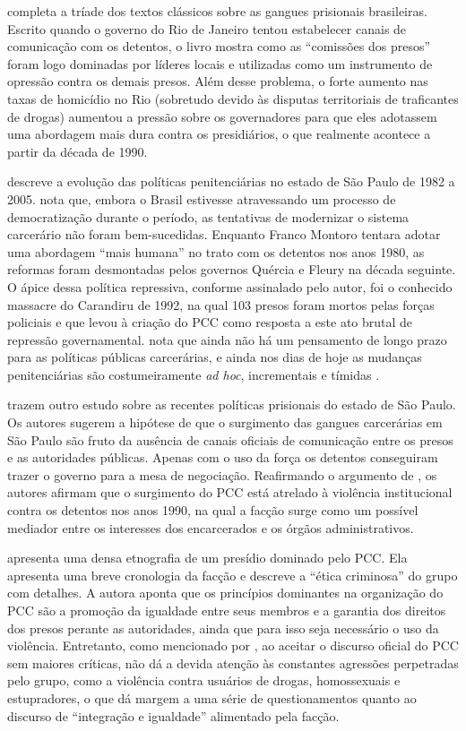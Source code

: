 \documentclass[a4paper,11pt]{article}
\begin{document}
\citet{coelho1987oficina} completa a tríade dos textos clássicos sobre as gangues prisionais brasileiras. Escrito quando o governo do Rio de Janeiro tentou estabelecer canais de comunicação com os detentos, o livro mostra como as ``comissões dos presos'' foram logo dominadas por líderes locais e utilizadas como um instrumento de opressão contra os demais presos. Além desse problema, o forte aumento nas taxas de homicídio no Rio (sobretudo devido às disputas territoriais de traficantes de drogas) aumentou a pressão sobre os governadores para que eles adotassem uma abordagem mais dura contra os presidiários, o que realmente acontece a partir da década de 1990.

\citet{salla2007montoro} descreve a evolução das políticas penitenciárias no estado de São Paulo de 1982 a 2005. \citeauthor{salla2007montoro} nota que, embora o Brasil estivesse atravessando um processo de democratização durante o período, as tentativas de modernizar o sistema carcerário não foram bem-sucedidas. Enquanto Franco Montoro tentara adotar uma abordagem ``mais humana'' no trato com os detentos nos anos 1980, as reformas foram desmontadas pelos governos Quércia e Fleury na década seguinte. O ápice dessa política repressiva, conforme assinalado pelo autor, foi o conhecido massacre do Carandiru de 1992, na qual 103 presos foram mortos pelas forças policiais e que levou à criação do PCC como resposta a este ato brutal de repressão governamental. \citeauthor{salla2007montoro} nota que ainda não há um pensamento de longo prazo para as políticas públicas carcerárias, e ainda nos dias de hoje as mudanças penitenciárias são costumeiramente \textit{ad hoc}, incrementais e tímidas \citep[383]{dias2011pulverizaccao}.

\citet{alvarez2013comissoes} trazem outro estudo sobre as recentes políticas prisionais do estado de São Paulo. Os autores sugerem a hipótese de que o surgimento das gangues carcerárias em São Paulo são fruto da ausência de canais oficiais de comunicação entre os presos e as autoridades públicas. Apenas com o uso da força os detentos conseguiram trazer o governo para a mesa de negociação. Reafirmando o argumento de \citet{salla2007montoro}, os autores afirmam que o surgimento do PCC está atrelado à violência institucional contra os detentos nos anos 1990, na qual a facção surge como um possível mediador entre os interesses dos encarcerados e os órgãos administrativos.

\citet{biondi2010junto} apresenta uma densa etnografia de um presídio dominado pelo PCC. Ela apresenta uma breve cronologia da facção e descreve a ``ética criminosa'' do grupo com detalhes. A autora aponta que os princípios dominantes na organização do PCC são a promoção da igualdade entre seus membros e a garantia dos direitos dos presos perante as autoridades, ainda que para isso seja necessário o uso da violência. Entretanto, como mencionado por \citet[376]{dias2011pulverizaccao}, ao aceitar o discurso oficial do PCC sem maiores críticas, \citeauthor{biondi2010junto} não dá a devida atenção às constantes agressões perpetradas pelo grupo, como a violência contra usuários de drogas, homossexuais e estupradores, o que dá margem a uma série de questionamentos quanto ao discurso de ``integração e igualdade'' alimentado pela facção.
\end{document}
